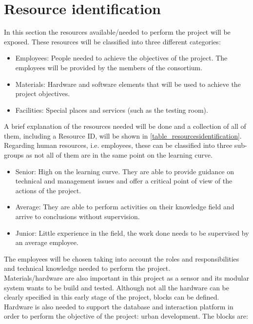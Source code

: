 \section{Resource identification}
In this section the resources available/needed to perform the project will be exposed. These resources will be classified into three different categories: 
\begin{itemize}
\item Employees: People needed to achieve the objectives of the project. The employees will be provided by the members of the consortium. 
\item Materials: Hardware and software elements that will be used to achieve the project objectives.
\item Facilities: Special places and services (such as the testing room). 
\end{itemize}
A brief explanation of the resources needed will be done and a collection of all of them, including a Resource ID, will be shown in \ref{table_resourcesidentification}.\\
Regarding human resources, i.e. employees, these can be classified into three sub-groups as not all of them are in the same point on the learning curve.
\begin{itemize}
\item Senior: High on the learning curve. They are able to provide guidance on technical and management issues and offer a critical point of view of the actions of the project.
\item Average: They are able to perform activities on their knowledge field and arrive to conclusions without supervision.
\item Junior: Little experience in the field, the work done needs to be supervised by an average employee.
\end{itemize}
The employees will be chosen taking into account the roles and responsibilities and technical knowledge needed to perform the project.\\
Materials/hardware are also important in this project as a sensor and its modular system wants to be build and tested. Although not all the hardware can be clearly specified in this early stage of the project, blocks can be defined. Hardware is also needed to support the database and interaction platform in order to perform the objective of the project: urban development. The blocks are: 
